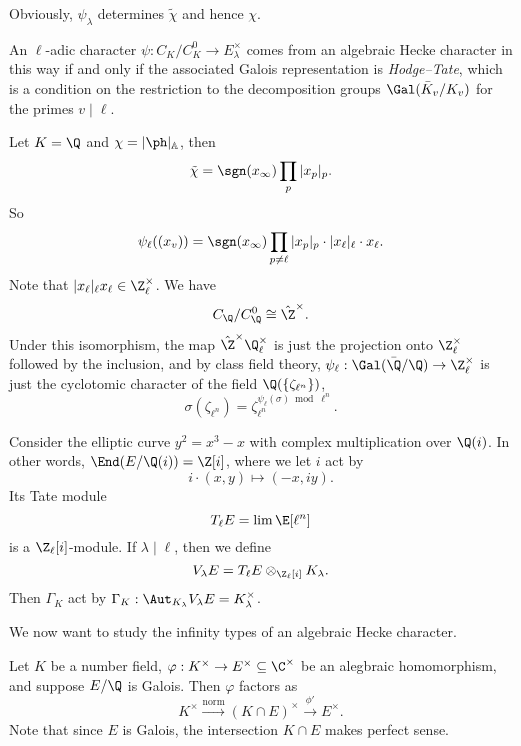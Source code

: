 \documentclass[a4paper]{article}
\newcommand\A{\mathbb{A}}
\begin{document}
Obviously, $\psi_\lambda$ determines $\tilde{\chi}$ and hence $\chi$.
\begin{fact}
  An $\ell$-adic character $\psi: C_K/C_K^0 \to E_\lambda^\times$ comes from an algebraic Hecke character in this way if and only if the associated Galois representation is \emph{Hodge--Tate}, which is a condition on the restriction to the decomposition groups $\Gal(\bar{K}_v/K_v)$ for the primes $v \mid \ell$.
\end{fact}

\begin{eg}
  Let $K = \Q$ and $\chi = |\ph |_{\A}$, then
  \[
    \tilde{\chi} = \sgn(x_\infty) \prod_p |x_p|_p.
  \]
  So
  \[
    \psi_\ell((x_v)) = \sgn(x_\infty) \prod_{p \not= \ell} |x_p|_p \cdot |x_\ell|_{\ell} \cdot x_\ell.
  \]
  Note that $|x_\ell|_{\ell} x_\ell \in \Z_\ell^\times$. We have
  \[
    C_\Q/C_\Q^0 \cong \hat{\Z}^\times.
  \]
  Under this isomorphism, the map $\hat{\Z}^\times \Q_\ell^\times$ is just the projection onto $\Z_\ell^\times$ followed by the inclusion, and by class field theory, $\psi_\ell: \Gal(\bar{\Q}/\Q) \to \Z_\ell^\times$ is just the cyclotomic character of the field $\Q(\{\zeta_{\ell^n}\})$,
  \[
    \sigma(\zeta_{\ell^n}) = \zeta_{\ell^n} ^{\psi_\ell(\sigma) \bmod \ell^n}.
  \]
\end{eg}

\begin{eg}
  Consider the elliptic curve $y^2 = x^3 - x$ with complex multiplication over $\Q(i)$. In other words, $\End(E/\Q(i)) = \Z[i]$, where we let $i$ act by
  \[
    i \cdot (x, y) \mapsto (-x, iy).
  \]
  Its Tate module
  \[
    T_\ell E = \lim \E[\ell^n]
  \]
  is a $\Z_\ell [i]$-module. If $\lambda \mid \ell$, then we define
  \[
    V_\lambda E = T_\ell E \otimes_{\Z_{\ell}[i]} K_\lambda.
  \]
  Then $\Gamma_K$ act by $\Gamma_K: \Aut_{K_\lambda} V_\lambda E = K_\lambda^\times$.
\end{eg}

We now want to study the infinity types of an algebraic Hecke character.
\begin{lemma}
  Let $K$ be a number field, $\varphi: K^\times \to E^\times \subseteq \C^\times$ be an alegbraic homomorphism, and suppose $E/\Q$ is Galois. Then $\varphi$ factors as
  \[
    K^\times \overset{\mathrm{norm}}{\longrightarrow} (K \cap E)^\times \overset{\phi'}{\longrightarrow} E^\times.
  \]
  Note that since $E$ is Galois, the intersection $K \cap E$ makes perfect sense.
\end{lemma}
\end{document}
